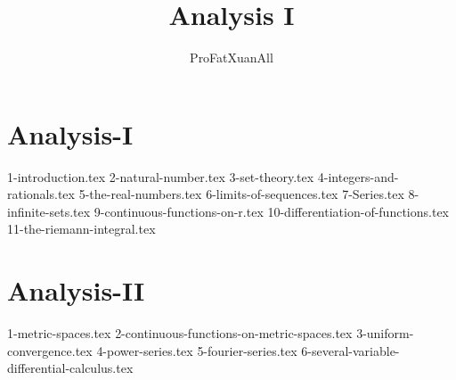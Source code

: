 \documentclass[11pt,a4paper]{book}
\theoremstyle{definition}
\theoremstyle{remark}
\begin{document}

\frontmatter

\title{Analysis I}
\author{ProFatXuanAll}
\maketitle

\tableofcontents


\mainmatter

\part{Analysis-I}

{1-introduction.tex}
{2-natural-number.tex}
{3-set-theory.tex}
{4-integers-and-rationals.tex}
{5-the-real-numbers.tex}
{6-limits-of-sequences.tex}
{7-Series.tex}
{8-infinite-sets.tex}
{9-continuous-functions-on-r.tex}
{10-differentiation-of-functions.tex}
{11-the-riemann-integral.tex}

\part{Analysis-II}

{1-metric-spaces.tex}
{2-continuous-functions-on-metric-spaces.tex}
{3-uniform-convergence.tex}
{4-power-series.tex}
{5-fourier-series.tex}
{6-several-variable-differential-calculus.tex}


\backmatter
\end{document}
